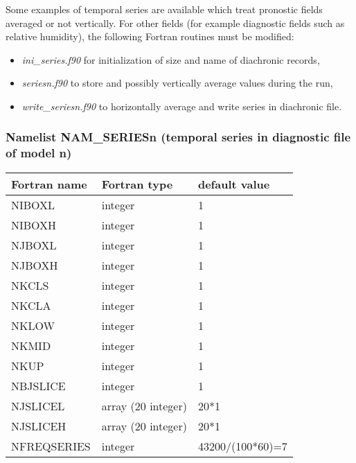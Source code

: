 Some examples of temporal series are available which treat pronostic fields 
averaged or not vertically. For other fields (for example diagnostic
fields such as relative humidity), the following Fortran
routines must be modified:
\begin{itemize}
\item  {\it ini\_series.f90} for initialization of size and name of diachronic
records,
\item  {\it seriesn.f90} to store and possibly vertically average values 
during the run,
\item  {\it write\_seriesn.f90} to horizontally average and write series in
diachronic file.
\end{itemize}
\subsubsection{Namelist NAM\_SERIESn (temporal series in diagnostic file of model n)} 
\begin{center}
\begin{tabular} {|l|l|l|}
\hline
Fortran name & Fortran type & default value \\
\hline
NIBOXL       & integer      & 1             \\
NIBOXH       & integer      & 1             \\
NJBOXL       & integer      & 1             \\
NJBOXH       & integer      & 1             \\
NKCLS        & integer      & 1            \\
NKCLA        & integer      & 1             \\
NKLOW        & integer      & 1             \\
NKMID        & integer      & 1             \\
NKUP         & integer      & 1             \\
NBJSLICE     & integer      & 1             \\
NJSLICEL     & array (20 integer)      & 20*1            \\
NJSLICEH     & array (20 integer)      & 20*1            \\
NFREQSERIES  & integer      & 43200/(100*60)=7     \\
\hline
\end{tabular}
\end{center}


